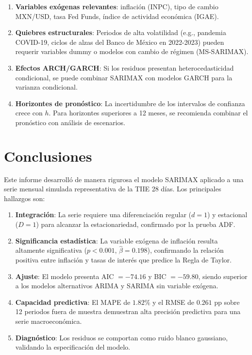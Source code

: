 \documentclass[12pt, letterpaper]{article}
\begin{document}
\begin{enumerate}
  \item \textbf{Variables exógenas relevantes}: inflación (INPC), tipo de cambio MXN/USD, tasa Fed Funds, índice de actividad económica (IGAE).
  \item \textbf{Quiebres estructurales}: Periodos de alta volatilidad (e.g., pandemia COVID-19, ciclos de alzas del Banco de México en 2022-2023) pueden requerir variables dummy o modelos con cambio de régimen (MS-SARIMAX).
  \item \textbf{Efectos ARCH/GARCH}: Si los residuos presentan heterocedasticidad condicional, se puede combinar SARIMAX con modelos GARCH para la varianza condicional.
  \item \textbf{Horizontes de pronóstico}: La incertidumbre de los intervalos de confianza crece con $h$. Para horizontes superiores a 12 meses, se recomienda combinar el pronóstico con análisis de escenarios.
\end{enumerate}

\section{Conclusiones}

Este informe desarrolló de manera rigurosa el modelo SARIMAX aplicado a una serie mensual simulada representativa de la TIIE 28 días. Los principales hallazgos son:

\begin{enumerate}
  \item \textbf{Integración}: La serie requiere una diferenciación regular ($d=1$) y estacional ($D=1$) para alcanzar la estacionariedad, confirmado por la prueba ADF.
  \item \textbf{Significancia estadística}: La variable exógena de inflación resulta altamente significativa ($p<0.001$, $\hat\beta = 0.198$), confirmando la relación positiva entre inflación y tasas de interés que predice la Regla de Taylor.
  \item \textbf{Ajuste}: El modelo presenta AIC $= -74.16$ y BIC $= -59.80$, siendo superior a los modelos alternativos ARIMA y SARIMA sin variable exógena.
  \item \textbf{Capacidad predictiva}: El MAPE de $1.82\%$ y el RMSE de $0.261$ pp sobre 12 periodos fuera de muestra demuestran alta precisión predictiva para una serie macroeconómica.
  \item \textbf{Diagnóstico}: Los residuos se comportan como ruido blanco gaussiano, validando la especificación del modelo.

\end{enumerate}
\end{document}
